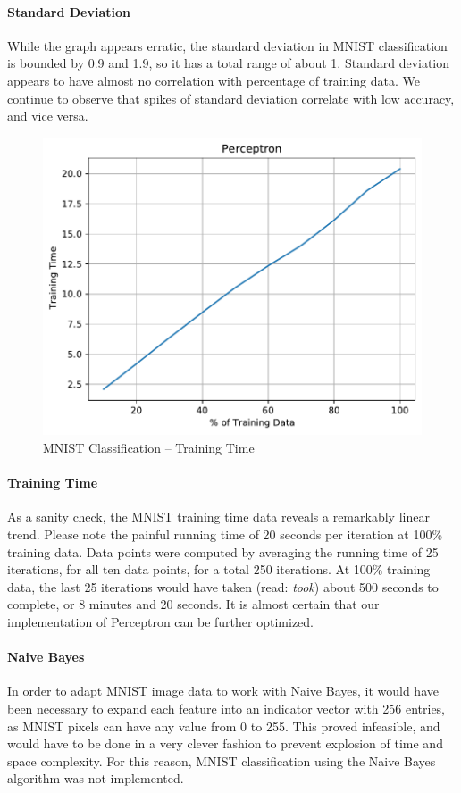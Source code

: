\documentclass{article}
\begin{document}
  \paragraph{Standard Deviation}
  While the graph appears erratic, the standard deviation in MNIST classification is bounded by 0.9 and 1.9, so it has a total range of about 1.
  Standard deviation appears to have almost no correlation with percentage of training data.
  We continue to observe that spikes of standard deviation correlate with low accuracy, and vice versa.
  \begin{figure}[H]
  \includegraphics[width=\linewidth]{figures/Perceptron_time_MNIST.pdf}\hfill
  \caption{MNIST Classification -- Training Time}
  \end{figure}
  \paragraph{Training Time}
  As a sanity check, the MNIST training time data reveals a remarkably linear trend.
  Please note the painful running time of 20 seconds per iteration at 100\% training data.
  Data points were computed by averaging the running time of 25 iterations, for all ten data points, for a total 250 iterations.
  At 100\% training data, the last 25 iterations would have taken (read: {\em took}) about 500 seconds to complete, or 8 minutes and 20 seconds.
  It is almost certain that our implementation of Perceptron can be further optimized.
  \paragraph{Naive Bayes}
  In order to adapt MNIST image data to work with Naive Bayes, it would have been necessary to expand each feature into an indicator vector with 256 entries, as MNIST pixels can have any value from 0 to 255.
  This proved infeasible, and would have to be done in a very clever fashion to prevent explosion of time and space complexity.
  For this reason, MNIST classification using the Naive Bayes algorithm was not implemented.
\end{document}
